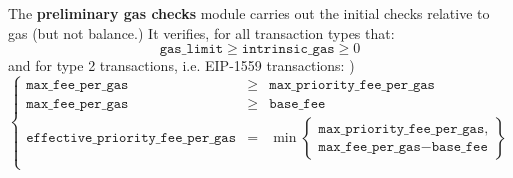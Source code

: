 The \textbf{preliminary gas checks} module carries out the initial checks relative to gas (but not balance.) It verifies, for all transaction types that:
\[
\texttt{gas\_limit} \geq \texttt{intrinsic\_gas} \geq 0
\]
and for type 2 transactions, i.e. \textsc{EIP-1559} transactions: )
\[
\left\{
\begin{array}{lcl}
	\texttt{max\_fee\_per\_gas}	& \geq & \texttt{max\_priority\_fee\_per\_gas} \\
	\texttt{max\_fee\_per\_gas}	& \geq & \texttt{base\_fee} \\
	\texttt{effective\_priority\_fee\_per\_gas}
	& = &
		\min\left\{
		\begin{array}{c}
		\texttt{max\_priority\_fee\_per\_gas}, \\
		\texttt{max\_fee\_per\_gas} - \texttt{base\_fee}
		\end{array}
		\right\} \\
\end{array}
\right.
\]